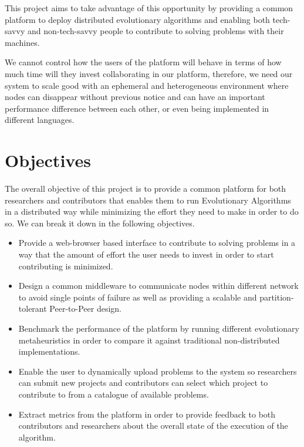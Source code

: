 This project aims to take advantage of this opportunity by providing a common platform to deploy distributed evolutionary algorithms and enabling both tech-savvy and non-tech-savvy people to contribute to solving problems with their machines.

We cannot control how the users of the platform will behave in terms of how much time will they invest collaborating in our platform, therefore, we need our system to scale good with an ephemeral and heterogeneous environment where nodes can disappear without previous notice and can have an important performance difference between each other, or even being implemented in different languages. 


\section{Objectives}
The overall objective of this project is to provide a common platform for both researchers and contributors that enables them to run Evolutionary Algorithms in a distributed way while minimizing the effort they need to make in order to do so. We can break it down in the following objectives.

\begin{itemize}
    \item Provide a web-browser based interface to contribute to solving problems in a way that the amount of effort the user needs to invest in order to start contributing is minimized.
    
    \item Design a common middleware to communicate nodes within different network to avoid single points of failure as well as providing a scalable and partition-tolerant Peer-to-Peer design.
    
    \item Benchmark the performance of the platform by running different evolutionary metaheuristics in order to compare it against traditional non-distributed implementations.
    
    \item Enable the user to dynamically upload problems to the system so researchers can submit new projects and contributors can select which project to contribute to from a catalogue of available problems.
    
    \item Extract metrics from the platform in order to provide feedback to both contributors and researchers about the overall state of the execution of the algorithm.
\end{itemize}
